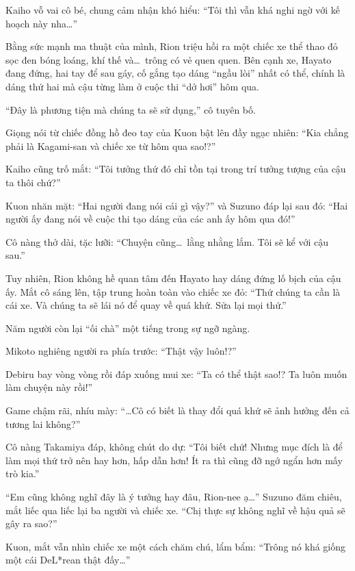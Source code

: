 \documentclass[../main.tex]{subfiles}
\begin{document}
Kaiho vỗ vai cô bé, chung cảm nhận khó hiểu: ``Tôi thì vẫn khá nghi ngờ với kế hoạch này nha\dots''

\ct

Bằng sức mạnh ma thuật của mình, Rion triệu hồi ra một chiếc xe thể thao đỏ sọc đen bóng loáng, khí thế và\dots\ trông có vẻ quen quen. Bên cạnh xe, Hayato đang đứng, hai tay để sau gáy, cố gắng tạo dáng ``ngầu lòi'' nhất có thể, chính là dáng thứ hai mà cậu từng làm ở cuộc thi ``dở hơi'' hôm qua.


``Đây là phương tiện mà chúng ta sẽ sử dụng,'' cô tuyên bố.

Giọng nói từ chiếc đồng hồ đeo tay của Kuon bật lên đầy ngạc nhiên: ``Kia chẳng phải là Kagami-san và chiếc xe từ hôm qua sao!?''

Kaiho cũng trố mắt: ``Tôi tưởng thứ đó chỉ tồn tại trong trí tưởng tượng của cậu ta thôi chứ?''

Kuon nhăn mặt: ``Hai người đang nói cái gì vậy?'' và Suzuno đáp lại sau đó: ``Hai người ấy đang nói về cuộc thi tạo dáng của các anh ấy hôm qua đó!''

Cô nàng thở dài, tặc lưỡi: ``Chuyện cũng\dots\ lằng nhằng lắm. Tôi sẽ kể với cậu sau.''

Tuy nhiên, Rion không hề quan tâm đến Hayato hay dáng đứng lố bịch của cậu ấy. Mắt cô sáng lên, tập trung hoàn toàn vào chiếc xe đỏ: ``Thứ chúng ta cần là cái xe. Và chúng ta sẽ lái nó để quay về quá khứ. Sửa lại mọi thứ.''

Năm người còn lại ``ối chà'' một tiếng trong sự ngỡ ngàng.

Mikoto nghiêng người ra phía trước: ``Thật vậy luôn!?''

Debiru bay vòng vòng rồi đáp xuống mui xe: ``Ta có thể thật sao!? Ta luôn muốn làm chuyện này rồi!''

Game chậm rãi, nhíu mày: ``\dots Cô có biết là thay đổi quá khứ sẽ ảnh hưởng đến cả tương lai không?''

Cô nàng Takamiya đáp, không chút do dự: ``Tôi biết chứ! Nhưng mục đích là để làm mọi thứ trở nên hay hơn, hấp dẫn hơn! Ít ra thì cũng đỡ ngớ ngẩn hơn mấy trò kia.''

``Em cũng không nghĩ đây là ý tưởng hay đâu, Rion-nee ạ\dots'' Suzuno đăm chiêu, mắt liếc qua liếc lại ba người và chiếc xe. ``Chị thực sự không nghĩ về hậu quả sẽ gây ra sao?''

Kuon, mắt vẫn nhìn chiếc xe một cách chăm chú, lẩm bẩm: ``Trông nó khá giống một cái DeL*rean thật đấy\dots''
\end{document}
